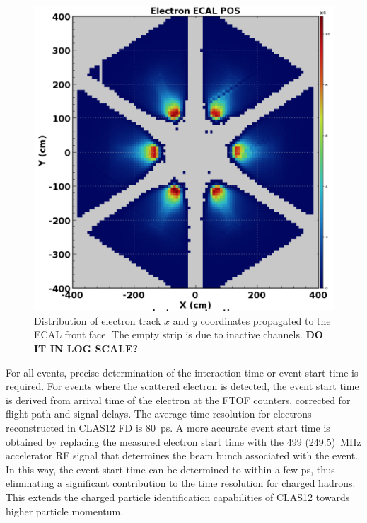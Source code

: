 \documentclass[final,3p,twocolumn]{elsarticle}
\begin{document}
\begin{figure}[htbp!]
\centerline{\includegraphics[width=1.0\columnwidth]{ElectronsOnPCAL.png}}
\caption{Distribution of electron track $x$ and $y$ coordinates propagated to the ECAL front face. The empty strip 
is due to inactive channels. {\bf DO IT IN LOG SCALE?}} 
\label{electrons-xy}
\end{figure}

For all events, precise determination of the interaction time or event start time is required. For events where the
scattered electron is detected, the event start time is derived from arrival time of the electron at the FTOF counters, 
corrected for flight path and signal delays.  The average time resolution for electrons reconstructed in CLAS12 FD is
80~ps. A more accurate event start time is obtained by replacing the measured electron start time with the 499
(249.5)~MHz accelerator RF signal that determines the beam bunch associated with the event. In this way, the event
start time can be determined to within a few ps, thus eliminating a significant contribution to the time resolution for
charged hadrons. This extends the charged particle identification capabilities of CLAS12 towards higher particle
momentum.
\end{document}
